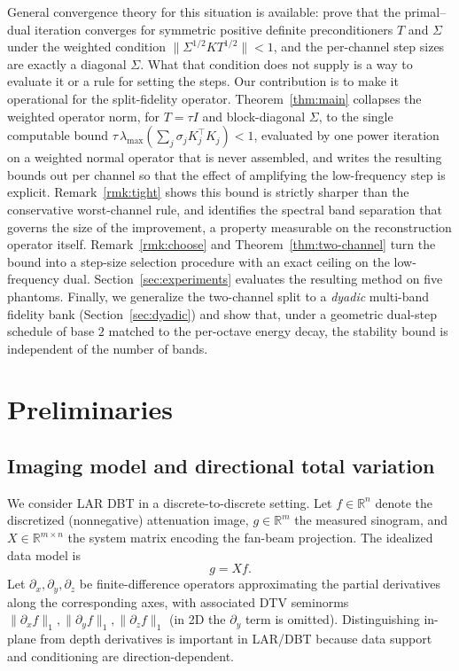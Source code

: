 \documentclass{article}
\newcommand{\R}{\mathbb{R}}
\begin{document}
General convergence theory for this situation is available: \citet{pock2011diagonal} prove that the primal--dual iteration converges for symmetric positive definite preconditioners $T$ and $\Sigma$ under the weighted condition $\|\Sigma^{1/2}KT^{1/2}\|<1$, and the per-channel step sizes are exactly a diagonal $\Sigma$. What that condition does not supply is a way to evaluate it or a rule for setting the steps. Our contribution is to make it operational for the split-fidelity operator. Theorem~\ref{thm:main} collapses the weighted operator norm, for $T=\tau I$ and block-diagonal $\Sigma$, to the single computable bound $\tau\,\lambda_{\max}(\sum_j\sigma_jK_j^\top K_j)<1$, evaluated by one power iteration on a weighted normal operator that is never assembled, and writes the resulting bounds out per channel so that the effect of amplifying the low-frequency step is explicit. Remark~\ref{rmk:tight} shows this bound is strictly sharper than the conservative worst-channel rule, and identifies the spectral band separation that governs the size of the improvement, a property measurable on the reconstruction operator itself. Remark~\ref{rmk:choose} and Theorem~\ref{thm:two-channel} turn the bound into a step-size selection procedure with an exact ceiling on the low-frequency dual. Section~\ref{sec:experiments} evaluates the resulting method on five phantoms. Finally, we generalize the two-channel split to a \emph{dyadic} multi-band fidelity bank (Section~\ref{sec:dyadic}) and show that, under a geometric dual-step schedule of base $2$ matched to the per-octave energy decay, the stability bound is independent of the number of bands.

\section{Preliminaries}
\label{sec:prelim}

\subsection{Imaging model and directional total variation}

We consider LAR DBT in a discrete-to-discrete setting. Let $f\in\R^{n}$ denote the discretized (nonnegative) attenuation image, $g\in\R^{m}$ the measured sinogram, and $X\in\R^{m\times n}$ the system matrix encoding the fan-beam projection. The idealized data model is
\begin{equation}
\label{eq:fwd}
g = X f .
\end{equation}
Let $\partial_x,\partial_y,\partial_z$ be finite-difference operators approximating the partial derivatives along the corresponding axes, with associated DTV seminorms $\|\partial_x f\|_1,\|\partial_y f\|_1,\|\partial_z f\|_1$ (in 2D the $\partial_y$ term is omitted). Distinguishing in-plane from depth derivatives is important in LAR/DBT because data support and conditioning are direction-dependent.
\end{document}
